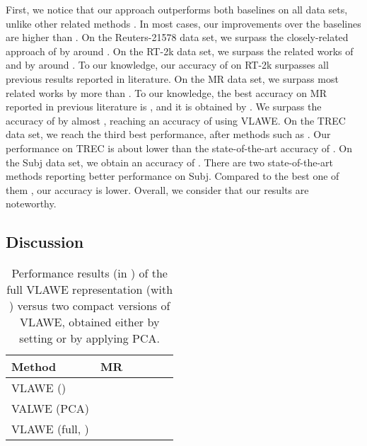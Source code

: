 \documentclass[11pt,a4paper]{article}
\begin{document}
First, we notice that our approach outperforms both baselines on all data sets, unlike other related methods \cite{Le-ICML-2014,Hill-NAACL-2016}. In most cases, our improvements over the baselines are higher than . On the Reuters-21578 data set, we surpass the closely-related approach of  by around . On the RT-2k data set, we surpass the related works of  and  by around . To our knowledge, our accuracy of  on RT-2k \cite{Pang-ACL-2004} surpasses all previous results reported in literature. On the MR data set, we surpass most related works by more than . To our knowledge, the best accuracy on MR reported in previous literature is , and it is obtained by . We surpass the accuracy of  by almost , reaching an accuracy of  using VLAWE. On the TREC data set, we reach the third best performance, after methods such as \cite{Cheng-IJCAI-2018,Zhou-COLING-2016,Zhou-IJCAI-2018}. Our performance on TREC is about  lower than the state-of-the-art accuracy of . On the Subj data set, we obtain an accuracy of . There are two state-of-the-art methods \cite{Cheng-IJCAI-2018,Zhao-IJCAI-2015} reporting better performance on Subj. Compared to the best one of them \cite{Cheng-IJCAI-2018}, our accuracy is  lower. Overall, we consider that our results are noteworthy.

\vspace*{-0.1cm}
\subsection{Discussion}
\vspace*{-0.1cm}

\begin{table}[!t]
\setlength\tabcolsep{5.5pt}
\begin{center}
\begin{tabular}{lccccc}
\hline
Method 										&	MR \\
\hline
\hline
VLAWE () 							&  \\
VALWE (PCA) 								&  \\										
\hline
VLAWE (full, )					&  \\
\hline
\end{tabular}
\end{center}
\vspace*{-0.2cm}
\caption{Performance results (in ) of the full VLAWE representation (with ) versus two compact versions of VLAWE, obtained either by setting  or by applying PCA.}
\label{tab_compact}
\vspace*{-0.3cm}
\end{table}
\end{document}
